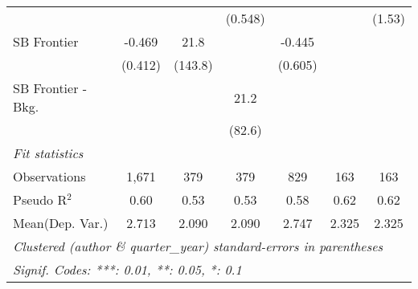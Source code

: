 \begin{tabular}{lcccccc}
                        &         &             & (0.548)    &         &              & (1.53)\\   
   SB Frontier          & -0.469  & 21.8        &            & -0.445  &              &   \\   
                        & (0.412) & (143.8)     &            & (0.605) &              &   \\   
   SB Frontier - Bkg.   &         &             & 21.2       &         &              &   \\   
                        &         &             & (82.6)     &         &              &   \\   
   \midrule
   \emph{Fit statistics}\\
   Observations         & 1,671   & 379         & 379        & 829     & 163          & 163\\  
   Pseudo R$^2$         & 0.60    & 0.53        & 0.53       & 0.58    & 0.62         & 0.62\\  
Mean(Dep. Var.) & 2.713 & 2.090 & 2.090 & 2.747 & 2.325 & 2.325 \\
   \midrule \midrule
   \multicolumn{7}{l}{\emph{Clustered (author \& quarter\_year) standard-errors in parentheses}}\\
   \multicolumn{7}{l}{\emph{Signif. Codes: ***: 0.01, **: 0.05, *: 0.1}}\\
\end{tabular}
\par\endgroup

